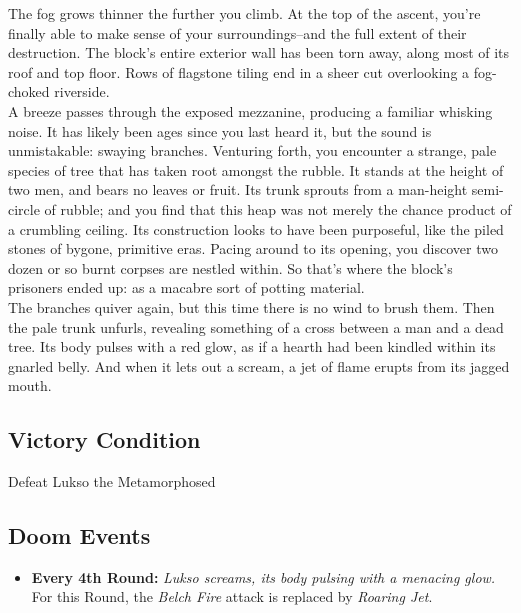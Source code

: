 The fog grows thinner the further you climb. At the top of the ascent, you’re finally able to make sense of your surroundings--and the full extent of their destruction. The block's entire exterior wall has been torn away, along most of its roof and top floor. Rows of flagstone tiling end in a sheer cut overlooking a fog-choked riverside.\\

A breeze passes through the exposed mezzanine, producing a familiar whisking noise. It has likely been ages since you last heard it, but the sound is unmistakable: swaying branches. Venturing forth, you encounter a strange, pale species of tree that has taken root amongst the rubble. It stands at the height of two men, and bears no leaves or fruit. Its trunk sprouts from a man-height semi-circle of rubble; and you find that this heap was not merely the chance product of a crumbling ceiling. Its construction looks to have been purposeful, like the piled stones of bygone, primitive eras. Pacing around to its opening, you discover two dozen or so burnt corpses are nestled within. So that's where the block's prisoners ended up: as a macabre sort of potting material.\\

The branches quiver again, but this time there is no wind to brush them. Then the pale trunk unfurls, revealing something of a cross between a man and a dead tree. Its body pulses with a red glow, as if a hearth had been kindled within its gnarled belly. And when it lets out a scream, a jet of flame erupts from its jagged mouth.\\

\subsection*{Victory Condition}
Defeat Lukso the Metamorphosed

\subsection*{Doom Events}
\begin{itemize}
\item \textbf{Every 4th Round:} \emph{Lukso screams, its body pulsing with a menacing glow.} For this Round, the \emph{Belch Fire} attack is replaced by \emph{Roaring Jet}.
\end{itemize}

\pagebreak

